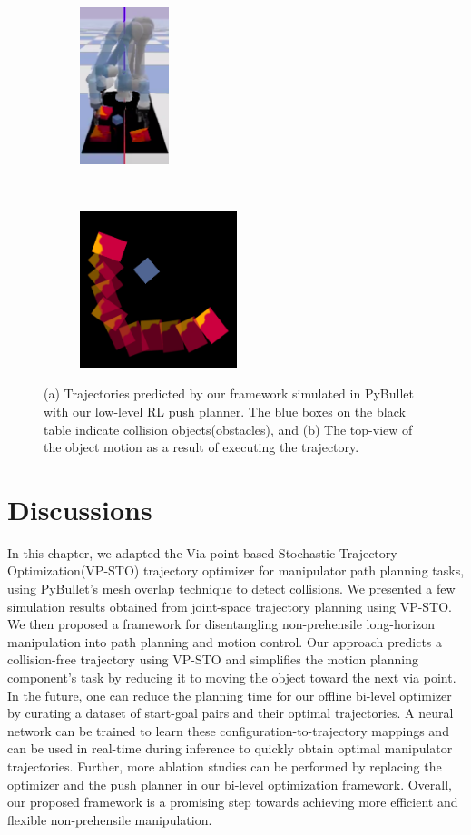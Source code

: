 \begin{figure}[t!]
    \centering
    \begin{subfigure}[t]{0.5\textwidth}
        \centering
        \includegraphics[height=1.8in]{figures/bl-manipulator/bl_sim.png}
    \end{subfigure}%
    ~ 
    \begin{subfigure}[t]{0.5\textwidth}
        \centering
        \includegraphics[height=1.8in]{figures/bl-manipulator/2d_object.png}
    \end{subfigure}
    \caption[Bi-level simulation in PyBullet]{(a) Trajectories predicted by our framework simulated in PyBullet with our low-level RL push planner. The blue boxes on the black table indicate collision objects(obstacles), and (b) The top-view of the object motion as a result of executing the trajectory.}
    \label{fig:bl_sim}
\end{figure}

\section{Discussions}

In this chapter, we adapted the Via-point-based Stochastic Trajectory Optimization(VP-STO) trajectory optimizer for manipulator path planning tasks, using PyBullet's mesh overlap technique to detect collisions. We presented a few simulation results obtained from joint-space trajectory planning using VP-STO. We then proposed a framework for disentangling non-prehensile long-horizon manipulation into path planning and motion control. Our approach predicts a collision-free trajectory using VP-STO and simplifies the motion planning component's task by reducing it to moving the object toward the next via point. In the future, one can reduce the planning time for our offline bi-level optimizer by curating a dataset of start-goal pairs and their optimal trajectories. A neural network can be trained to learn these configuration-to-trajectory mappings and can be used in real-time during inference to quickly obtain optimal manipulator trajectories. Further, more ablation studies can be performed by replacing the optimizer and the push planner in our bi-level optimization framework. Overall, our proposed framework is a promising step towards achieving more efficient and flexible non-prehensile manipulation.